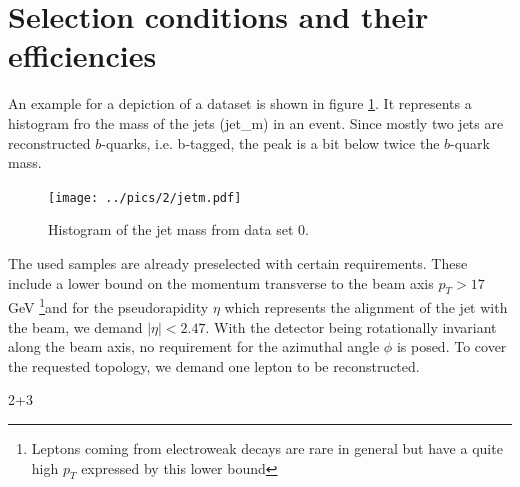 \FloatBarrier
\section{Selection conditions and their efficiencies}
\label{sec:selection}
An example for a depiction of a dataset is shown in figure \ref{pic:examplePlot}. It represents a histogram fro the mass of the jets (jet\_m) in an
event. Since mostly two jets are reconstructed $b$-quarks, i.e. b-tagged, the peak is a bit below twice the $b$-quark mass. 
\begin{figure}[t]
 \texttt{[image: ../pics/2/jetm.pdf]}
 \caption{Histogram of the jet mass from data set 0.}
 \label{pic:examplePlot}
\end{figure}
The used samples are already preselected with certain requirements. These include a lower bound on the momentum transverse to the beam axis $p_T>17$ GeV 
\footnote[1]{Leptons coming from electroweak
decays are rare in general but have a quite high $p_T$ expressed by this lower bound}and
for the pseudorapidity $\eta$ which represents the alignment of the jet with the beam, we demand $|\eta| < 2.47$. With the detector being rotationally
invariant along the beam axis, no requirement for the azimuthal angle $\phi$ is posed. To cover the requested topology, we demand 
one lepton to be reconstructed. 

2+3
	

